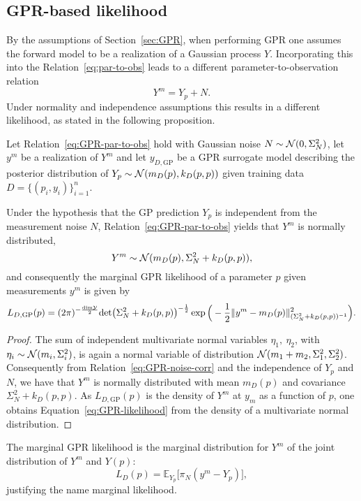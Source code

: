 \subsection{GPR-based likelihood}\label{sec:GPlike}
By the assumptions of Section~\ref{sec:GPR}, when performing GPR one assumes the forward model to be a realization of a Gaussian process $Y$.
Incorporating this into the Relation~\eqref{eq:par-to-obs} leads to a different parameter-to-observation relation
\begin{equation}\label{eq:GPR-par-to-obs}
    Y^m = Y_p + N.
\end{equation}
Under normality and independence assumptions this results in a different likelihood, as stated in the following proposition.

\begin{prp}
    Let Relation~\eqref{eq:GPR-par-to-obs} hold with Gaussian noise $N \sim \mathcal N (0, \Sigma_N^2)$, let $y^m$ be a realization of $Y^m$ and let $y_{D, \text{GP}}$ be a GPR surrogate model describing the posterior distribution of $Y_p \sim \mathcal N( m_D(p), k_D(p,p) )$ given training data $D = \{ (p_i, y_i) \}_{i=1}^n$.

    Under the hypothesis that the GP prediction $Y_p$ is independent from the measurement noise $N$, Relation~\eqref{eq:GPR-par-to-obs} yields that $Y^m$ is normally distributed,
    \[
    Y^m \sim \mathcal N(m_D(p), \Sigma_N^2 + k_D(p,p)), 
    \]
    and consequently the marginal GPR likelihood of a parameter $p$ given measurements $y^m$ is given by
    \begin{equation}\label{eq:GPR-likelihood}
        L_{D, \text{GP}}(p) = (2\pi)^{-\frac{\text{dim} \mathcal Y}{2}} \text{det}\big ( \Sigma_N^2 + k_D(p, p) \big )^{-\frac{1}{2}} \exp \Big( -\frac{1}{2}\lVert y^m - m_D(p)\rVert_{(\Sigma_N^2 + k_D(p,p))^{-1}}^2 \Big ).
    \end{equation}
\end{prp}
\begin{proof}
    The sum of independent multivariate normal variables $\eta_1, \ \eta_2$, with $\eta_i \sim \mathcal N(m_i, \Sigma^2_i)$, is again a normal variable of distribution $\mathcal N ( m_1 + m_2, \Sigma_1^2, \Sigma_2^2)$.
    Consequently from Relation~\eqref{eq:GPR-noise-corr} and the independence of $Y_p$ and $N$, we have that $Y^m$ is normally distributed with mean $m_D(p)$ and covariance $\Sigma_N^2 + k_D(p,p)$. \newline
    As $L_{D, \text{GP}}(p)$ is the density of $Y^m$ at $y_m$ as a function of $p$, one obtains Equation~\eqref{eq:GPR-likelihood} from the density of a multivariate normal distribution.
\end{proof}
\begin{rmk}
    The marginal GPR likelihood is the marginal distribution for $Y^m$ of the joint distribution of $Y^m$ and $Y(p)$:
    \begin{equation*}
        L_{D}(p) =  \mathbb E_{Y_p} \Big [ \pi_N (y^m - Y_p) \Big ],
    \end{equation*}
    justifying the name marginal likelihood.
\end{rmk}

